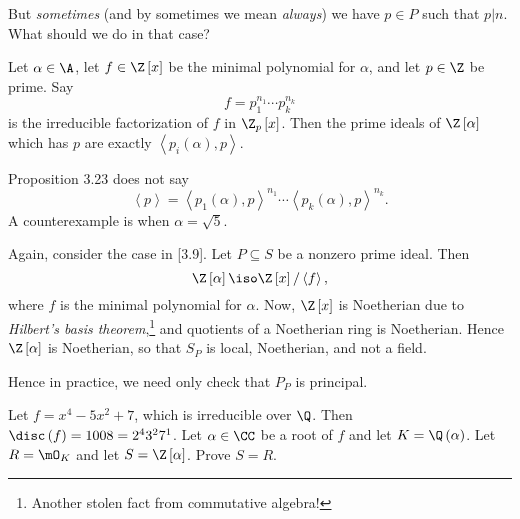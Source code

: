 \documentclass[pmath441]{subfiles}
\begin{document}
    \np But \textit{sometimes} (and by sometimes we mean \textit{always}) we have $p\in P$ such that $p|n$. What should we do in that case?

    \begin{prop}{}
        Let $\alpha\in\A$, let $f\in\Z\left[ x \right]$ be the minimal polynomial for $\alpha$, and let $p\in\Z$ be prime. Say
        \begin{equation*}
            f = p_1^{n_1}\cdots p_k^{n_k}
        \end{equation*}
        is the irreducible factorization of $f$ in $\Z_p\left[ x \right]$. Then the prime ideals of $\Z\left[ \alpha \right]$ which has $p$ are exactly $\left< p_i\left( \alpha \right),p \right>$. 
    \end{prop}

    \placeqed[Assignment 6]

    \clearpage
    
    \np Proposition 3.23 does not say
    \begin{equation*}
        \left< p \right> = \left< p_1\left( \alpha \right),p \right>^{n_1}\cdots\left< p_k\left( \alpha \right),p \right>^{n_k}.   
    \end{equation*}
    A counterexample is when $\alpha=\sqrt{5}$.

    \np Again, consider the case in [3.9]. Let $P\subseteq S$ be a nonzero prime ideal. Then
    \begin{equation*}
        \Z\left[ \alpha \right] \iso \Z\left[ x \right] /\left< f \right>,
    \end{equation*}
    where $f$ is the minimal polynomial for $\alpha$. Now, $\Z\left[ x \right]$ is Noetherian due to \textit{Hilbert's basis theorem},\footnote{Another stolen fact from commutative algebra!} and quotients of a Noetherian ring is Noetherian. Hence $\Z\left[ \alpha \right]$ is Noetherian, so that $S_P$ is local, Noetherian, and not a field.

    Hence in practice, we need only check that $P_P$ is principal.

    \begin{example}{}
        Let $f = x^{4}-5x^{2}+7$, which is irreducible over $\Q$. Then $\disc\left( f \right) = 1008 = 2^{4}3^{2}7^1$. Let $\alpha\in\CC$ be a root of $f$ and let $K=\Q\left( \alpha \right)$. Let $R=\mO_K$ and let $S=\Z\left[ \alpha \right]$. Prove $S=R$.
    \end{example}
\end{document}
